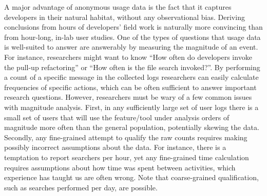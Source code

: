 

A major advantage of anonymous usage data is the fact that it captures developers in their natural habitat, without any observational bias. Deriving conclusions from hours of developers' field work is naturally more convincing than from hour-long, in-lab user studies. One of the types of questions that usage data is well-suited to answer are answerably by measuring the magnitude of an event. For instance, researchers might want to know ``How often do developers invoke the pull-up refactoring'' or ``How often is the file search invoked?''. By performing a count of a specific message in the collected logs researchers can easily calculate frequencies of specific actions, which can be often sufficient to answer important research questions. However, researchers must be wary of a few common issues with magnitude analysis. First, in any sufficiently large set of user logs there is a small set of users that will use the feature/tool under analysis orders of magnitude more often than the general population, potentially skewing the data. Secondly, any fine-grained attempt to qualify the raw counts requires making possibly incorrect assumptions about the data. For instance, there is a temptation to report searchers per hour, yet any fine-grained time calculation requires assumptions about how time was spent between activities, which experience has taught us are often wrong. Note that coarse-grained qualification, such as searches performed per day, are possible.   
